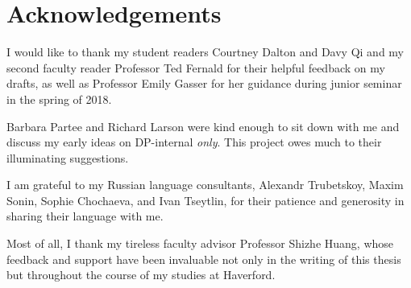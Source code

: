 \section*{Acknowledgements}
I would like to thank my student readers Courtney Dalton and Davy Qi and my second faculty reader Professor Ted Fernald for their helpful feedback on my drafts, as well as Professor Emily Gasser for her guidance during junior seminar in the spring of 2018.

Barbara Partee and Richard Larson were kind enough to sit down with me and discuss my early ideas on DP-internal \textit{only}. This project owes much to their illuminating suggestions.

I am grateful to my Russian language consultants, Alexandr Trubetskoy, Maxim Sonin, Sophie Chochaeva, and Ivan Tseytlin, for their patience and generosity in sharing their language with me.

Most of all, I thank my tireless faculty advisor Professor Shizhe Huang, whose feedback and support have been invaluable not only in the writing of this thesis but throughout the course of my studies at Haverford.